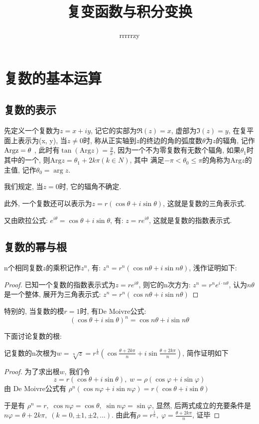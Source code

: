 \documentclass[12pt, a4paper, oneside]{ctexart}
\title{复变函数与积分变换}
\author{rrrrrzy}
\theoremstyle{plain}
\theoremstyle{definition}
\theoremstyle{definition}
\begin{document}
\maketitle
\section{复数的基本运算}
\subsection{复数的表示}
先定义一个复数为$z = x + iy$, 记它的实部为$\Re(z)=x$, 虚部为$\Im(z)=y$, 在复平面上表示为(x, y), 当$z\neq 0$时, 
称从正实轴到$z$的终边的角的弧度数$\theta$为$z$的辐角, 记作 $\text{\text{Arg}z}=\theta $
, 此时有$\tan (\text{Arg}z) = \frac{y}{x}$, 因为一个不为零复数有无数个辐角, 
如果$\theta_{1}$时其中的一个, 则$\text{Arg}z=\theta_{1}+2k\pi(k\in N)$, 其中
满足$-\pi<\theta_{0}\leq \pi$的角称为$\text{Arg}z$的主值, 记作$\theta_{0}=\arg z$.

我们规定, 当$z=0$时, 它的辐角不确定.

此外, 一个复数还可以表示为$z=r(\cos\theta+i\sin\theta)$, 这就是复数的三角表示式.

又由欧拉公式: $e^{i\theta}=\cos\theta+i\sin\theta$, 有: $z=re^{i\theta}$, 
这就是复数的指数表示式.

\subsection{复数的幂与根}
n个相同复数$z$的乘积记作$z^{n}$, 有: $z^{n}=r^{n}(\cos n\theta+i\sin n\theta)$, 浅作证明如下:

\begin{proof}
已知一个复数的指数表示式为$z=re^{i\theta}$, 则它的n次方为: $z^{n}=r^{n}e^{i\cdot n\theta}$, 认为$n\theta$
是一个整体, 展开为三角表示式: $z^{n}=r^{n}(\cos n\theta+i\sin n\theta)$

\end{proof}

特别的, 当复数的模$r=1$时, 有De Moivre公式: 
\[
    (\cos\theta+i\sin\theta)^{n}=\cos n\theta+i\sin n\theta
\]

下面讨论复数的根:

记复数的n次根为$w=\sqrt[n]{z}=r^{\frac{1}{n}}(\cos\frac{\theta+2k\pi}{n}+i\sin\frac{\theta+2k\pi}{n})$, 简作证明如下
\begin{proof}
为了求出根$w$, 我们令
\[
    z=r(\cos\theta+i\sin\theta),\; w=\rho (\cos\varphi+i\sin\varphi)
\]
由 De Moivre公式有 $\rho^{n}(\cos n\varphi+i\sin n\varphi)=r(\cos\theta+i\sin\theta) $

于是有 $\rho^{n}=r,\; \cos n\varphi=\cos\theta,\; \sin n\varphi=\sin\varphi$, 显然, 后两式成立的充要条件是 
$n\varphi=\theta+2k\pi,\; (k=0, \pm1, \pm2,...)$. 由此有$\rho=r^{\frac{1}{n}},
 \;\varphi=\frac{\theta+2k\pi}{n}$, 证毕
    
\end{proof}
\end{document}
